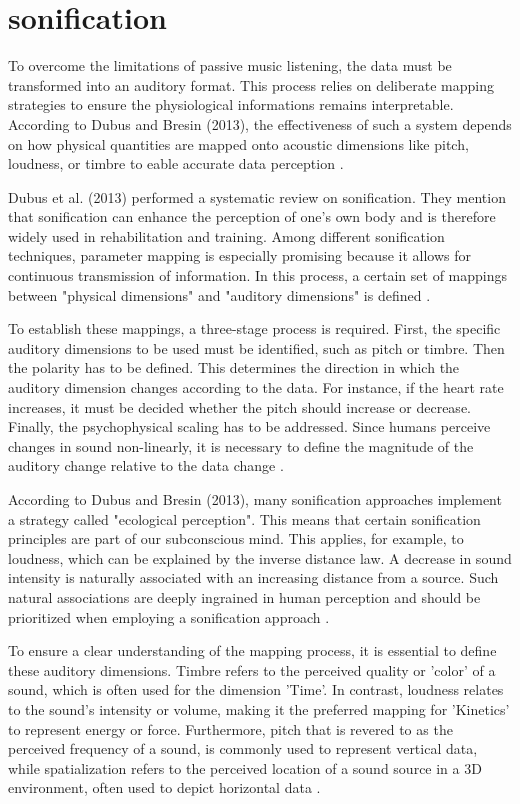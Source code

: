 \section{sonification}

To overcome the limitations of passive music listening, the data must be transformed into an auditory format. This process relies on deliberate mapping strategies to ensure the physiological informations remains interpretable. According to Dubus and Bresin (2013), the effectiveness of such a system depends on how physical quantities are mapped onto acoustic dimensions like pitch, loudness, or timbre to eable accurate data perception \cite{dubus2013systematic}.

Dubus et al. (2013) performed a systematic review on sonification. They mention that sonification can enhance the perception of one's own body and is therefore widely used in rehabilitation and training. Among different sonification techniques, parameter mapping is especially promising because it allows for continuous transmission of information. In this process, a certain set of mappings between "physical dimensions" and "auditory dimensions" is defined \cite{dubus2013systematic}.

To establish these mappings, a three-stage process is required. First, the specific auditory dimensions to be used must be identified, such as pitch or timbre. Then the polarity has to be defined. This determines the direction in which the auditory dimension changes according to the data. For instance, if the heart rate increases, it must be decided whether the pitch should increase or decrease. Finally, the psychophysical scaling has to be addressed. Since humans perceive changes in sound non-linearly, it is necessary to define the magnitude of the auditory change relative to the data change \cite{dubus2013systematic} \cite{walker2000psychophysical}.

According to Dubus and Bresin (2013), many sonification approaches implement a strategy called "ecological perception". This means that certain sonification principles are part of our subconscious mind. This applies, for example, to loudness, which can be explained by the inverse distance law. A decrease in sound intensity is naturally associated with an increasing distance from a source. Such natural associations are deeply ingrained in human perception and should be prioritized when employing a sonification approach \cite{dubus2013systematic}.

To ensure a clear understanding of the mapping process, it is essential to define these auditory dimensions. Timbre refers to the perceived quality or 'color' of a sound, which is often used for the dimension 'Time'. In contrast, loudness relates to the sound's intensity or volume, making it the preferred mapping for 'Kinetics' to represent energy or force. Furthermore, pitch that is revered to as the perceived frequency of a sound, is commonly used to represent vertical data, while spatialization refers to the perceived location of a sound source in a 3D environment, often used to depict horizontal data \cite{dubus2013systematic}.

